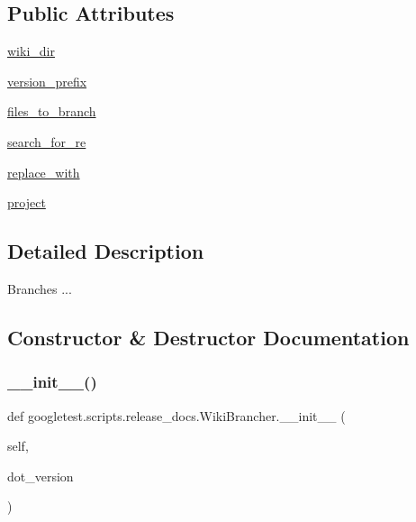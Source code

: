 \subsection*{Public Attributes}
\begin{DoxyCompactItemize}
\item 
\mbox{\hyperlink{classgoogletest_1_1scripts_1_1release__docs_1_1_wiki_brancher_ac6834b61659d1f442969c20789d308a3}{wiki\+\_\+dir}}
\item 
\mbox{\hyperlink{classgoogletest_1_1scripts_1_1release__docs_1_1_wiki_brancher_a569d193392594cf8e1e95941610bad77}{version\+\_\+prefix}}
\item 
\mbox{\hyperlink{classgoogletest_1_1scripts_1_1release__docs_1_1_wiki_brancher_ac52d0d4735a6830c7ca4c38ff5cc8d72}{files\+\_\+to\+\_\+branch}}
\item 
\mbox{\hyperlink{classgoogletest_1_1scripts_1_1release__docs_1_1_wiki_brancher_a811a03c26f0793a0133b70ddbc4e4562}{search\+\_\+for\+\_\+re}}
\item 
\mbox{\hyperlink{classgoogletest_1_1scripts_1_1release__docs_1_1_wiki_brancher_ae1e5951fcdaf177196cb76729a102119}{replace\+\_\+with}}
\item 
\mbox{\hyperlink{classgoogletest_1_1scripts_1_1release__docs_1_1_wiki_brancher_a8aebbcd9d203fe846ca86ce0648bccda}{project}}
\end{DoxyCompactItemize}


\subsection{Detailed Description}
\begin{DoxyVerb}Branches ...\end{DoxyVerb}
 

\subsection{Constructor \& Destructor Documentation}
\mbox{\label{classgoogletest_1_1scripts_1_1release__docs_1_1_wiki_brancher_a3f0c0ee189c0f00060f63d8a8a469f23}} 
\subsubsection{\texorpdfstring{\_\_init\_\_()}{\_\_init\_\_()}}
{\footnotesize\ttfamily def googletest.\+scripts.\+release\+\_\+docs.\+Wiki\+Brancher.\+\_\+\+\_\+init\+\_\+\+\_\+ (\begin{DoxyParamCaption}\item[{}]{self,  }\item[{}]{dot\+\_\+version }\end{DoxyParamCaption})}



